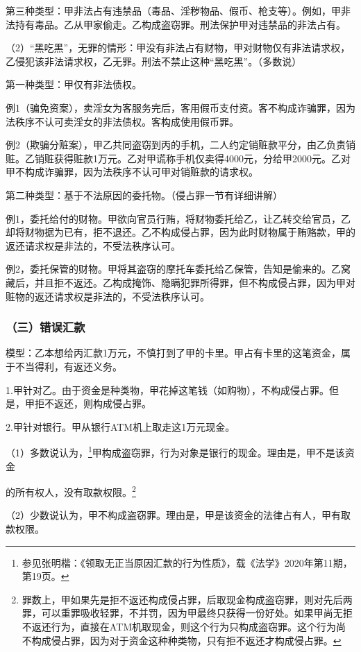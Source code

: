 第三种类型：甲非法占有违禁品（毒品、淫秽物品、假币、枪支等）。例如，甲非法持有毒品。乙从甲家偷走。乙构成盗窃罪。刑法保护甲对违禁品的非法占有。

（2）“黑吃黑”，无罪的情形：甲没有非法占有财物，甲对财物仅有非法请求权，乙侵犯该非法请求权，乙无罪。刑法不禁止这种“黑吃黑”。（多数说）

第一种类型：甲仅有非法债权。

例1（骗免资案），卖淫女为客服务完后，客用假币支付资。客不构成诈骗罪，因为法秩序不认可卖淫女的非法债权。客构成使用假币罪。

例2（欺骗分赃案），甲乙共同盗窃到丙的手机，二人约定销赃款平分，由乙负责销赃。乙销赃获得赃款1万元。乙对甲谎称手机仅卖得4000元，分给甲2000元。乙对甲不构成诈骗罪，因为法秩序不认可甲对销赃款的请求权。

第二种类型：基于不法原因的委托物。（侵占罪一节有详细讲解）

例1，委托给付的财物。甲欲向官员行贿，将财物委托给乙，让乙转交给官员，乙却将财物据为已有，拒不退还。乙不构成侵占罪，因为此时财物属于贿赂款，甲的返还请求权是非法的，不受法秩序认可。

例2，委托保管的财物。甲将其盗窃的摩托车委托给乙保管，告知是偷来的。乙窝藏后，并且拒不返还。乙构成掩饰、隐瞒犯罪所得罪，但不构成侵占罪，因为甲对赃物的返还请求权是非法的，不受法秩序认可。

\subsubsection*{（三）错误汇款}

模型：乙本想给丙汇款1万元，不慎打到了甲的卡里。甲占有卡里的这笔资金，属于不当得利，有返还义务。

1.甲针对乙。由于资金是种类物，甲花掉这笔钱（如购物），不构成侵占罪。但是，甲拒不返还，则构成侵占罪。

2.甲针对银行。甲从银行ATM机上取走这1万元现金。

（1）多数说认为，\footnote{参见张明楷：《领取无正当原因汇款的行为性质》，载《法学》2020年第11期，第19页。}甲构成盗窃罪，行为对象是银行的现金。理由是，甲不是该资金

的所有权人，没有取款权限。\footnote{罪数上，甲如果先是拒不返还构成侵占罪，后取现金构成盗窃罪，则对先后两罪，可以重罪吸收轻罪，不并罚，因为甲最终只获得一份好处。如果甲尚无拒不返还行为，直接在ATM机取现金，则这个行为只构成盗窃罪。这个行为尚不构成侵占罪，因为对于资金这种种类物，只有拒不返还才构成侵占罪。}

（2）少数说认为，甲不构成盗窃罪。理由是，甲是该资金的法律占有人，甲有取款权限。

